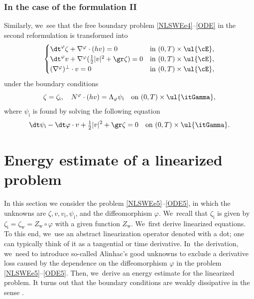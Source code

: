 \subsubsection{In the case of the formulation II}
Similarly, we~see that the free boundary problem \eqref{NLSWEe4}--\eqref{ODE} in the second reformulation is transformed into
\begin{equation}\label{NLSWEe5}
\begin{cases}
\dt^\varphi\zeta+\nabla^\varphi\cdot(hv) = 0 &\text{in } (0,T)\times\ul{\cE}, \\
\dt^\varphi v+\nabla^\varphi(\frac12|v|^2+\gr\zeta) = 0 &\text{in } (0,T)\times\ul{\cE}, \\
(\nabla^\varphi)^\perp\cdot v = 0 &\text{in } (0,T)\times\ul{\cE},
\end{cases}
\end{equation}
under the boundary conditions
\begin{equation}\label{BC5}
\zeta=\zeta_\mathrm{i}, \quad N^\varphi\cdot (h v) = \Lambda_\varphi \psi_\mathrm{i} \quad\text{on } (0,T)\times\ul{\itGamma},
\end{equation}
where $\psi_\mathrm{i}$ is found by solving the following equation
\begin{equation}\label{ODE5}
\dt \psi_\mathrm{i} -\dt \varphi\cdot v + \tfrac12|v|^2+\gr\zeta = 0 \quad\text{on } (0,T)\times\ul{\itGamma}.
\end{equation}

\section{Energy estimate of a linearized problem}\label{sect:EE}
In this section we consider the problem \eqref{NLSWEe5}--\eqref{ODE5}, in which the unknowns are $\zeta,v,v_\mathrm{i}, \psi_\mathrm{i}$, and the diffeomorphism $\varphi$. We~recall that $\zeta_\mathrm{i}$ is given by $\zeta_\mathrm{i}=\zeta_\mathrm{w}=Z_\mathrm{w}\circ\varphi$ with a given function $Z_\mathrm{w}$. We~first derive linearized equations.
To this end, we~use an abstract linearization operator denoted with a dot; one can typically think of it as a tangential or time derivative. In~the derivation, we~need to introduce so-called Alinhac's good unknowns to exclude a derivative loss caused by the dependence on the diffeomorphism $\varphi$
in the problem \eqref{NLSWEe5}--\eqref{ODE5}.
Then, we~derive an energy estimate for the linearized problem.
It turns out that the boundary conditions are weakly dissipative in the sense \cite{IguchiLannes2023}.

